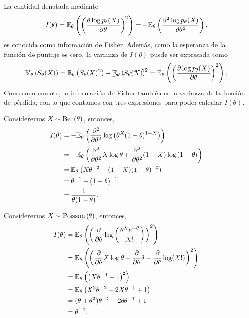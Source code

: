 \begin{definition}
La cantidad denotada mediante  
\begin{equation}
		I(\theta) = \mathbb{E}_\theta \left(\left(\frac{\partial \log   p_\theta(X)}{\partial\theta}\right)^2\right) = 	-\mathbb{E}_\theta \left(\frac{\partial^2 \log   p_\theta(X)}{\partial\theta^2}\right),
\end{equation}	
es conocida como información de Fisher. Además, como la esperanza de la función de puntaje es cero, la varianza de $I(\theta)$ puede ser expresada como 
\begin{equation}
	\mathbb{V}_\theta \left(S_\theta(X)\right) = \mathbb{E}_\theta \left(S_\theta(X)^2\right) - \cancel{\mathbb{E}_\theta \left(S_\theta(X)\right)^2} = \mathbb{E}_\theta \left(\left(\frac{\partial \log   p_\theta(X)}{\partial\theta}\right)^2\right).
\end{equation}
Consecuentemente, la información de Fisher también es la varianza de la función de pérdida, con lo que contamos con tres expresiones para poder calcular $I(\theta)$. 
\end{definition}

\begin{exercise}
	Consideremos $X\sim\text{Ber}\left(\theta\right)$, entonces, 
	\begin{align}
		I(\theta) &= -\mathbb{E}_\theta \left(\frac{\partial^2}{\partial\theta^2}\log\left(\theta^X(1-\theta)^{1-X}\right)\right)\nonumber\\
		&= -\mathbb{E}_\theta \left(\frac{\partial^2}{\partial\theta^2} X\log\theta + \frac{\partial^2}{\partial\theta^2} 	(1-X)\log\left(1-\theta\right)	\right)\nonumber\\
		&= \mathbb{E}_\theta \left(X\theta^{-2} + (1-X)(1-\theta)^{-2}	\right)\nonumber\\
		&= \theta^{-1} + (1-\theta)^{-1}	\nonumber\\
		&= 	\frac{1}{\theta(1-\theta)}.
	\end{align}
\end{exercise}

\begin{exercise}
	Consideremos $X\sim\text{Poisson}\left(\theta\right)$, entonces, 
	\begin{align}
		I(\theta) &= \mathbb{E}_\theta \left(\left(\frac{\partial}{\partial\theta}\log\left(\frac{\theta^Xe^{-\theta}}{X!}\right)\right)^2\right)\nonumber	\\
		&= \mathbb{E}_\theta \left(\left( \frac{\partial}{\partial\theta}X\log\theta - \frac{\partial}{\partial\theta}\theta - \frac{\partial}{\partial\theta}\log(X!)\right)^2\right)\nonumber\\
		&= \mathbb{E}_\theta \left(\left( X\theta^{-1} - 1\right)^2\right)\nonumber	\\
		&= \mathbb{E}_\theta \left( X^2\theta^{-2} -2X\theta^{-1}+ 1\right)\nonumber	\\
		&= (\theta+\theta^2)\theta^{-2} -2\theta\theta^{-1}+ 1\nonumber\\
		&= \theta^{-1}.\nonumber	
	\end{align}
\end{exercise}


